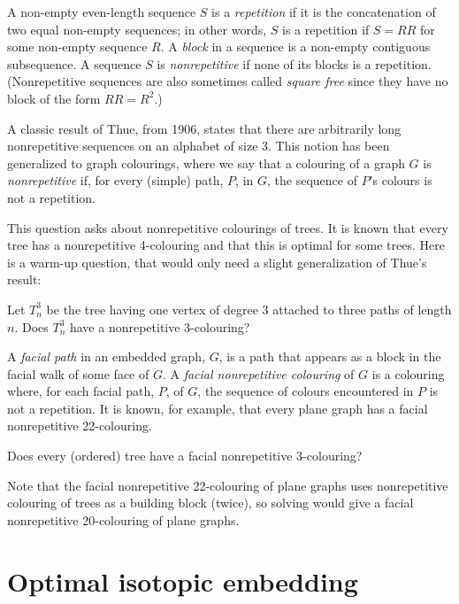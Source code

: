 \documentclass{patmorin}
\begin{document}
A non-empty even-length sequence $S$ is a \emph{repetition} if it is the
concatenation of two equal non-empty sequences; in other words, $S$ is
a repetition if $S=RR$ for some non-empty sequence $R$.  A \emph{block}
in a sequence is a non-empty contiguous subsequence.  A sequence $S$ is
\emph{nonrepetitive} if none of its blocks is a repetition. (Nonrepetitive
sequences are also sometimes called \emph{square free} since they have
no block of the form $RR=R^2$.)

A classic result of Thue, from 1906, states that there are arbitrarily
long nonrepetitive sequences on an alphabet of size 3.  This notion has
been generalized to graph colourings, where we say that a colouring of
a graph $G$ is \emph{nonrepetitive} if, for every (simple) path, $P$,
in $G$, the sequence of $P$'s colours is not a repetition.

This question asks about nonrepetitive colourings of trees.  It is known
that every tree has a nonrepetitive 4-colouring and that this is optimal
for some trees. Here is a warm-up question, that would only need a slight
generalization of Thue's result:

\begin{op}
  Let $T^3_n$ be the tree having one vertex of degree 3 attached to three
  paths of length $n$.  Does $T^3_n$ have a nonrepetitive 3-colouring?
\end{op}

A \emph{facial path} in an embedded graph, $G$, is a path that appears
as a block in the facial walk of some face of $G$.  A \emph{facial
nonrepetitive colouring} of $G$ is a colouring where, for each facial
path, $P$, of $G$, the sequence of colours encountered in $P$ is not
a repetition. It is known, for example, that every plane graph has a
facial nonrepetitive 22-colouring.

\begin{op}
  Does every (ordered) tree have a facial nonrepetitive 3-colouring? 
\end{op}

Note that the facial nonrepetitive 22-colouring of plane graphs
uses nonrepetitive colouring of trees as a building block (twice), so
solving  would give a facial nonrepetitive
20-colouring of plane graphs.

\section{Optimal isotopic embedding}
\end{document}
